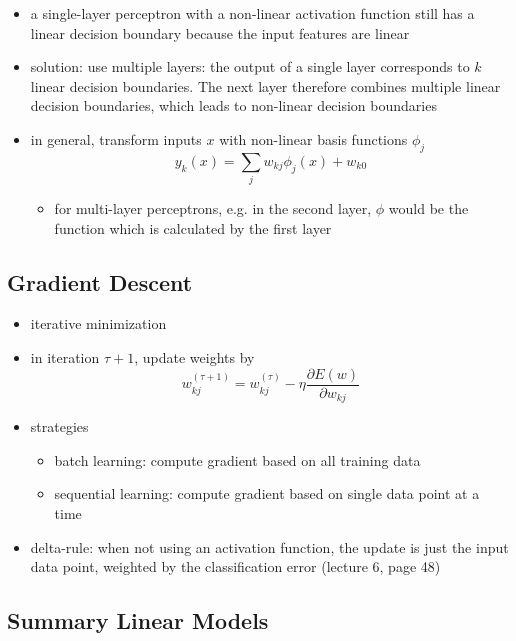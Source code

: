 \documentclass{article}
\begin{document}
\begin{itemize}
  \begin{itemize}
    \item a single-layer perceptron with a non-linear activation function still has a linear decision boundary because the input features are linear
    \item solution: use multiple layers: the output of a single layer corresponds to $k$ linear decision boundaries. The next layer therefore combines multiple linear decision boundaries, which leads to non-linear decision boundaries
    \item in general, transform inputs $x$ with non-linear basis functions $\phi_j$
    \[
      y_k(x) = \sum_j w_{kj}\phi_j(x) + w_{k0}
    \]
    \begin{itemize}
      \item for multi-layer perceptrons, e.g. in the second layer, $\phi$ would be the function which is calculated by the first layer
    \end{itemize}
  \end{itemize}
\end{itemize}

\subsection{Gradient Descent}

\begin{itemize}
  \item iterative minimization
  \item in iteration $\tau + 1$, update weights by
  \[
    w_{kj}^{(\tau + 1)} = w_{kj}^{(\tau)} - \eta \frac{\partial E(w)}{\partial w_{kj}}
  \]
  \item strategies
  \begin{itemize}
    \item batch learning: compute gradient based on all training data
    \item sequential learning: compute gradient based on single data point at a time
  \end{itemize}
  \item delta-rule: when not using an activation function, the update is just the input data point, weighted by the classification error (lecture 6, page 48)
\end{itemize}

\subsection{Summary Linear Models}
\end{document}
